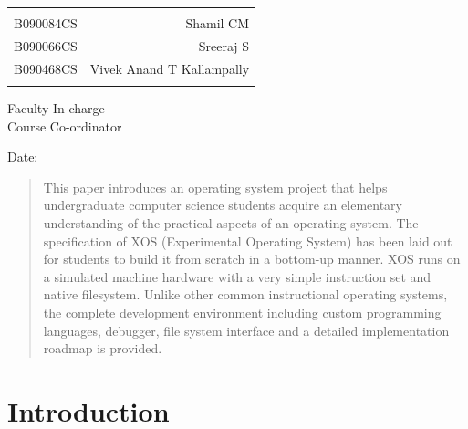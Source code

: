 \documentclass[10pt]{report}
\begin{document}
\begin{table}[h]
\centering
\begin{tabular}{lr}
\hline
\\
B090084CS & Shamil CM \\ 
B090066CS & Sreeraj S \\
B090468CS & Vivek Anand T Kallampally \\
\\
\hline
\end{tabular}
\end{table}

\vfill


\begin{flushright}
Faculty In-charge\\[1.5cm]
Course Co-ordinator\\[1.0cm]
\end{flushright}

\begin{flushleft}
Date:
\end{flushleft}



\begin{abstract}
This paper introduces an operating system project that helps undergraduate computer science students acquire an elementary understanding of the practical aspects of an operating system. The specification of XOS (Experimental Operating System) has been laid out for students to build it from scratch in a bottom-up manner. XOS runs on a simulated machine hardware with a very simple  instruction set  and native filesystem. Unlike other common instructional operating systems, the complete development environment including custom programming languages, debugger, file system interface and a detailed implementation roadmap is provided. 

\end{abstract}


\tableofcontents

\newpage
{}




\chapter{Introduction}
\end{document}
